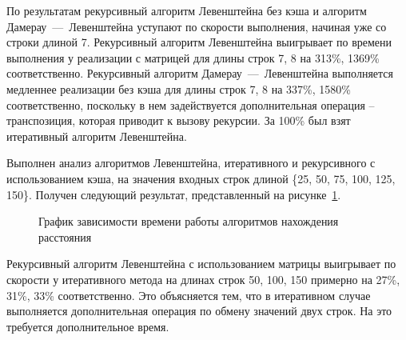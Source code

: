 По результатам рекурсивный алгоритм Левенштейна без кэша и алгоритм Дамерау~---~Левенштейна уступают по скорости выполнения, начиная уже со строки длиной 7. Рекурсивный алгоритм Левенштейна выигрывает по времени выполнения у реализации с матрицей для длины строк 7, 8 на 313\%, 1369\% соответственно. Рекурсивный алгоритм Дамерау~---~Левенштейна выполняется медленнее реализации без кэша для длины строк 7, 8 на 337\%, 1580\% соответственно, поскольку в нем задействуется дополнительная операция -- транспозиция, которая приводит к вызову рекурсии. За 100\% был взят итеративный алгоритм Левенштейна.

Выполнен анализ алгоритмов Левенштейна, итеративного и рекурсивного с использованием кэша, на значения входных строк длиной \{25, 50, 75, 100, 125, 150\}. Получен следующий результат, представленный на рисунке~\ref{fg:6_2}.
\begin{figure}[H]
	\centering
	\caption{График зависимости времени работы алгоритмов нахождения расстояния} 
	\label{fg:6_2}
\end{figure} 

Рекурсивный алгоритм Левенштейна с использованием матрицы выигрывает по скорости у итеративного метода на длинах строк 50, 100, 150 примерно на 27\%, 31\%, 33\% соответственно. Это объясняется тем, что в итеративном случае выполняется дополнительная операция по обмену значений двух строк. На это требуется дополнительное время.

